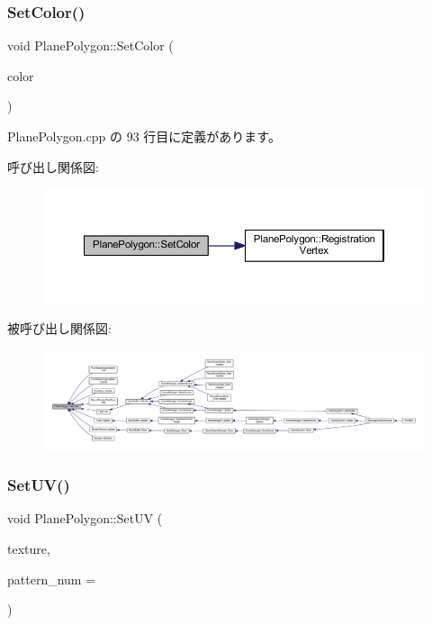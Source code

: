 \subsubsection{\texorpdfstring{Set\+Color()}{SetColor()}}
{\footnotesize\ttfamily void Plane\+Polygon\+::\+Set\+Color (\begin{DoxyParamCaption}\item[{\mbox{\hyperlink{_vector3_d_8h_a680c30c4a07d86fe763c7e01169cd6cc}{X\+Color4}}}]{color }\end{DoxyParamCaption})}



 Plane\+Polygon.\+cpp の 93 行目に定義があります。

呼び出し関係図\+:\nopagebreak
\begin{figure}[H]
\begin{center}
\leavevmode
\includegraphics[width=350pt]{class_plane_polygon_a55307fc341641d7fd42fe2269acbd113_cgraph}
\end{center}
\end{figure}
被呼び出し関係図\+:
\nopagebreak
\begin{figure}[H]
\begin{center}
\leavevmode
\includegraphics[width=350pt]{class_plane_polygon_a55307fc341641d7fd42fe2269acbd113_icgraph}
\end{center}
\end{figure}
\mbox{\label{class_plane_polygon_a081458fcb9e758dd8be5b027c66a92ad}} 
\subsubsection{\texorpdfstring{Set\+U\+V()}{SetUV()}}
{\footnotesize\ttfamily void Plane\+Polygon\+::\+Set\+UV (\begin{DoxyParamCaption}\item[{const \mbox{\hyperlink{class_texture_object}{Texture\+Object}} $\ast$}]{texture,  }\item[{const int}]{pattern\+\_\+num = {} }\end{DoxyParamCaption})}



